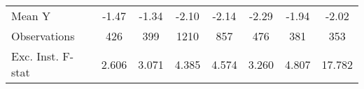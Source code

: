 {\begin{tabular}{l*{7}{c}}
\midrule
Mean Y      &       -1.47         &       -1.34         &       -2.10         &       -2.14         &       -2.29         &       -1.94         &       -2.02         \\
Observations&         426         &         399         &        1210         &         857         &         476         &         381         &         353         \\
Exc. Inst. F-stat&       2.606         &       3.071         &       4.385         &       4.574         &       3.260         &       4.807         &      17.782         \\
\bottomrule
\end{tabular}
}
